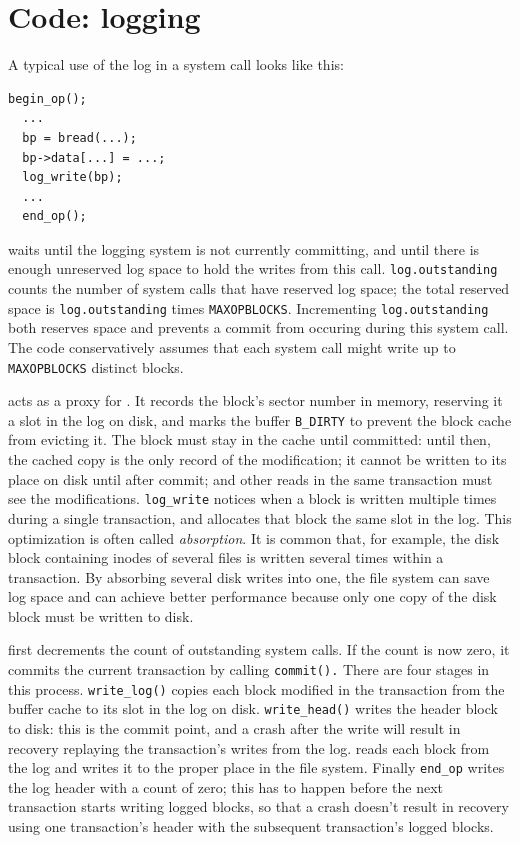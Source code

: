 \section{Code: logging}

A typical use of the log in a system call looks like this:
\begin{lstlisting}[]
  begin_op();
  ...
  bp = bread(...);
  bp->data[...] = ...;
  log_write(bp);
  ...
  end_op();
\end{lstlisting}

waits until
the logging system is not currently committing, and until
there is enough unreserved log space to hold
the writes from this call.
\lstinline{log.outstanding}
counts the number of system calls that have reserved log
space; the total reserved space is 
\lstinline{log.outstanding}
times
\lstinline{MAXOPBLOCKS}.
Incrementing
\lstinline{log.outstanding}
both reserves space and prevents a commit
from occuring during this system call.
The code conservatively assumes that each system call might write up to
\lstinline{MAXOPBLOCKS}
distinct blocks.

acts as a proxy for 
.
It records the block's sector number in memory,
reserving it a slot in the log on disk,
and marks the buffer
\lstinline{B_DIRTY}
to prevent the block cache from evicting it.
The block must stay in the cache until committed:
until then, the cached copy is the only record
of the modification; it cannot be written to
its place on disk until after commit;
and other reads in the same transaction must
see the modifications.
\lstinline{log_write}
notices when a block is written multiple times during a single
transaction, and allocates that block the same slot in the log.
This optimization is often called
\textit{absorption}.
It is common that, for example, the disk block containing inodes
of several files is written several times within a transaction.  By absorbing
several disk writes into one, the file system can save log space and
can achieve better performance because only one copy of the disk block must be
written to disk.

first decrements the count of outstanding system calls.
If the count is now zero, it commits the current
transaction by calling
\lstinline{commit().}
There are four stages in this process.
\lstinline{write_log()}
copies each block modified in the transaction from the buffer
cache to its slot in the log on disk.
\lstinline{write_head()}
writes the header block to disk: this is the
commit point, and a crash after the write will
result in recovery replaying the transaction's writes from the log.
reads each block from the log and writes it to the proper
place in the file system.
Finally
\lstinline{end_op}
writes the log header with a count of zero;
this has to happen before the next transaction starts writing
logged blocks, so that a crash doesn't result in recovery
using one transaction's header with the subsequent transaction's
logged blocks.

